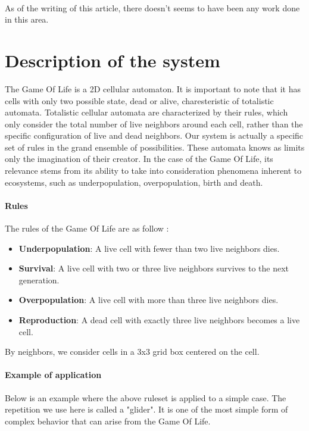\documentclass{article}
\begin{document}
\paragraph{}
As of the writing of this article, there doesn't seems to have been
any work done in this area.


\section{Description of the system}
The Game Of Life is a 2D cellular automaton. It is important to note that it
has cells with only two possible state, dead or alive, charesteristic of totalistic 
automata. Totalistic cellular automata are characterized by their rules, which only 
consider the total number of live neighbors around each cell, rather than the specific 
configuration of live and dead neighbors. Our system is actually a specific set of rules
in the grand ensemble of possibilities. These automata knows as limits only the imagination of
their creator. In the case of the Game Of Life, its relevance stems from its ability to take into
consideration phenomena inherent to ecosystems, such as underpopulation, overpopulation, birth and death.

\paragraph*{Rules}
The rules of the Game Of Life are as follow \cite{catagolue} :
\begin{itemize}
    \item \textbf{Underpopulation}: A live cell with fewer than two live neighbors dies.
    \item \textbf{Survival}: A live cell with two or three live neighbors survives to the next generation.
    \item \textbf{Overpopulation}: A live cell with more than three live neighbors dies.
    \item \textbf{Reproduction}: A dead cell with exactly three live neighbors becomes a live cell.
\end{itemize}

By neighbors, we consider cells in a 3x3 grid box centered on the cell.

\paragraph*{Example of application}
Below is an example where the above ruleset is applied to a simple case.
The repetition we use here is called a "glider". It is one of the most simple
form of complex behavior that can arise from the Game Of Life.
\end{document}
